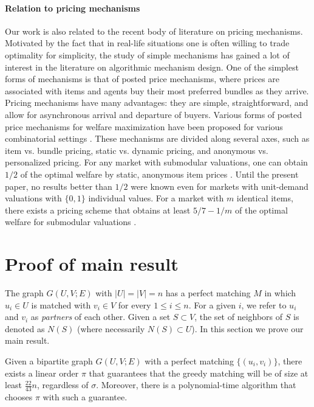 \paragraph*{Relation to pricing mechanisms}
Our work is also related to the recent body of literature on pricing mechanisms.
Motivated by the fact that in real-life situations one is often willing to trade optimality for simplicity, the study of simple mechanisms has gained a lot of interest in the literature on algorithmic mechanism design.
One of the simplest forms of mechanisms is that of posted price mechanisms, where prices are associated with items and agents buy their most preferred bundles as they arrive.
Pricing mechanisms have many advantages: they are simple, straightforward, and allow for asynchronous arrival and departure of buyers. %
Various forms of posted price mechanisms for welfare maximization have been proposed for various combinatorial settings \cite{FeldmanGL15,DuttingFKL16,Lucier17,EzraFRS20}. These mechanisms are divided along several axes, such as item vs. bundle pricing, static vs. dynamic pricing, and anonymous vs. personalized pricing.
For any market with submodular valuations, one can obtain $1/2$ of the optimal welfare by static, anonymous item prices \cite{FeldmanGL15}.
Until the present paper, no %
results better than  %
$1/2$ were known even for markets with unit-demand valuations with $\{0,1\}$ individual values.
For a market with $m$ identical items, there exists a pricing scheme that obtains at least $5/7-1/m$ of the optimal welfare for submodular valuations \cite{EzraFRS20}.






\section{Proof of main result}
\label{sec:main-result}

The graph $G(U,V;E)$ with $|U| = |V| = n$ has a perfect matching $M$ in which $u_i \in U$ is matched with $v_i \in V$ for every $1 \le i \le n$. For a given $i$, we refer to $u_i$ and $v_i$ as \emph{partners} of each other. Given a set $S \subset V$, the set of neighbors of $S$ is denoted  as $N(S)$ (where necessarily $N(S) \subset U$).
%
In this section we prove our main result.

\begin{theorem}
	\label{thm:86}
	Given a bipartite graph $G(U,V;E)$ with a perfect matching $\{(u_i,v_i)\}$, there exists a linear order $\pi$ that guarantees that the greedy matching will be of size at least $\frac{22}{43}n$, regardless of $\sigma$. Moreover, there is a polynomial-time algorithm that chooses $\pi$ with such a guarantee.
\end{theorem}

